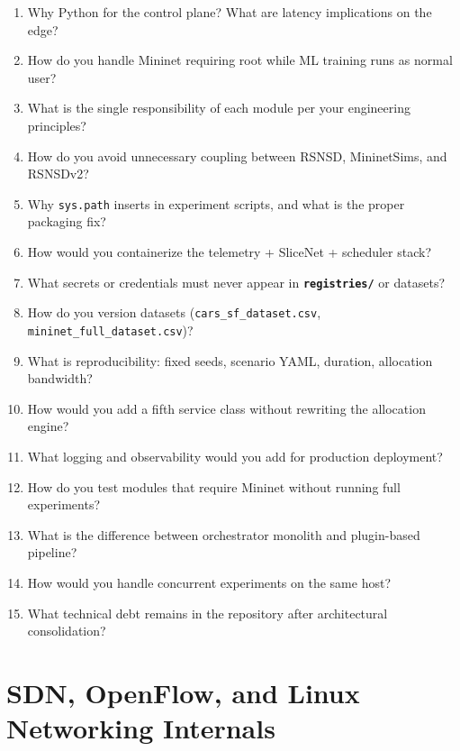 \documentclass[11pt,a4paper]{article}
\newcommand{\proj}[1]{\textbf{\texttt{#1}}}
\begin{document}
\begin{enumerate}
    \item Why Python for the control plane? What are latency implications on the edge?
    \item How do you handle Mininet requiring root while ML training runs as normal user?
    \item What is the single responsibility of each module per your engineering principles?
    \item How do you avoid unnecessary coupling between RSNSD, MininetSims, and RSNSDv2?
    \item Why \texttt{sys.path} inserts in experiment scripts, and what is the proper packaging fix?
    \item How would you containerize the telemetry + SliceNet + scheduler stack?
    \item What secrets or credentials must never appear in \proj{registries/} or datasets?
    \item How do you version datasets (\texttt{cars\_sf\_dataset.csv}, \texttt{mininet\_full\_dataset.csv})?
    \item What is reproducibility: fixed seeds, scenario YAML, duration, allocation bandwidth?
    \item How would you add a fifth service class without rewriting the allocation engine?
    \item What logging and observability would you add for production deployment?
    \item How do you test modules that require Mininet without running full experiments?
    \item What is the difference between orchestrator monolith and plugin-based pipeline?
    \item How would you handle concurrent experiments on the same host?
    \item What technical debt remains in the repository after architectural consolidation?
\end{enumerate}

\section{SDN, OpenFlow, and Linux Networking Internals}
\end{document}
